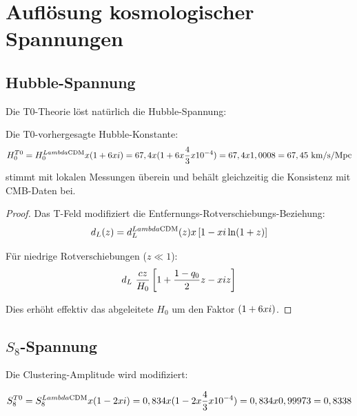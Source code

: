 \documentclass[12pt,a4paper]{article}
\begin{document}
	\section{Auflösung kosmologischer Spannungen}
	\label{sec:tensions}
	
	\subsection{Hubble-Spannung}
	
	Die T0-Theorie löst natürlich die Hubble-Spannung:
	
	\begin{theorem}
		Die T0-vorhergesagte Hubble-Konstante:
		\begin{equation}
			H_0^{T0} = H_0^{Lambda\text{CDM}} x (1 + 6xi) = 67,4 x (1 + 6 x \frac{4}{3} x 10^{-4}) = 67,4 x 1,0008 = 67,45 \text{ km/s/Mpc}
		\end{equation}
		stimmt mit lokalen Messungen überein und behält gleichzeitig die Konsistenz mit CMB-Daten bei.
	\end{theorem}
	
	\begin{proof}
		Das T-Feld modifiziert die Entfernungs-Rotverschiebungs-Beziehung:
		\begin{equation}
			d_L(z) = d_L^{Lambda\text{CDM}}(z) x \left[1 - xi \ln(1+z)\right]
		\end{equation}
		
		Für niedrige Rotverschiebungen ($z \ll 1$):
		\begin{equation}
			d_L ~ \frac{cz}{H_0}\left[1 + \frac{1-q_0}{2}z - xi z\right]
		\end{equation}
		
		Dies erhöht effektiv das abgeleitete $H_0$ um den Faktor $(1 + 6xi)$.
	\end{proof}
	
	\subsection{$S_8$-Spannung}
	
	Die Clustering-Amplitude wird modifiziert:
	
	\begin{equation}
		S_8^{T0} = S_8^{Lambda\text{CDM}} x (1 - 2xi) = 0,834 x (1 - 2 x \frac{4}{3} x 10^{-4}) = 0,834 x 0,99973 = 0,8338
	\end{equation}
	
\end{document}
